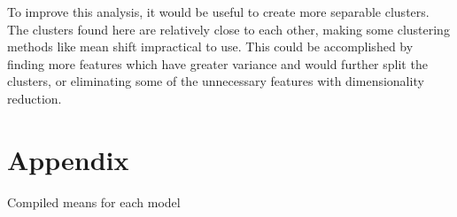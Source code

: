 \documentclass[12pt]{article}
\begin{document}

To improve this analysis, it would be useful to create more separable clusters. The clusters found here are relatively close to each other, making some clustering methods like mean shift impractical to use. This could be accomplished by finding more features which have greater variance and would further split the clusters, or eliminating some of the unnecessary features with dimensionality reduction. 

\newpage

\section*{Appendix}
\small
Compiled means for each model
\end{document}
